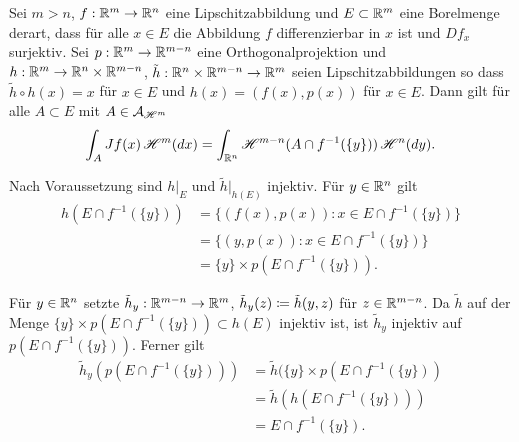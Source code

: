 \documentclass[a4paper,twoside,DIV15,BCOR12mm]{scrbook}
\newcommand{\A}{\mathcal A}
\newcommand{\HM}{\H}
\begin{document}
\begin{lemma}
\label{lem:3.15}
Sei $m>n$, $f:\mathbb{R}^m\to\mathbb{R}^n$ eine Lipschitzabbildung und $E\subset \mathbb{R}^m$ eine Borelmenge derart, dass für alle $x\in E$ die Abbildung $f$ differenzierbar in $x$ ist und $Df_x$ surjektiv. Sei $p:\mathbb{R}^m\to\mathbb{R}^{m-n}$ eine Orthogonalprojektion und $h:\mathbb{R}^m \to \mathbb{R}^n \times \mathbb{R}^{m-n}$, $\tilde h: \mathbb{R}^n\times\mathbb{R}^{m-n}\to\mathbb{R}^m$ seien Lipschitzabbildungen so dass $\tilde h \circ h(x) = x$ für $x\in E$ und $h(x) = (f(x),p(x))$ für $x\in E$. Dann gilt für alle $A\subset E$ mit $A\in \A_{\HM^m}$
\[
\int_A Jf(x) \,\HM^m(dx) = \int_{\MdR^n} \HM^{m-n}(A \cap f^{-1}(\{y\}))\, \HM^n(dy).
\]
\end{lemma}

\begin{beweis}
Nach Voraussetzung sind $h|_E$ und $\tilde h|_{h(E)}$ injektiv. Für $y\in\mathbb{R}^n$ gilt
\begin{align*}
h(E \cap f^{-1}(\{y\}))
&= \{(f(x),p(x)) : x\in E\cap f^{-1}(\{y\})\} \\
&= \{(y,p(x)) : x \in E\cap f^{-1}(\{y\})\} \\
&= \{y\}\times p(E\cap f^{-1}(\{y\})).
\end{align*}

Für $y\in\mathbb{R}^n$ setzte $\tilde h_y: \mathbb{R}^{m-n}\to\mathbb{R}^m$, $\tilde h_y (z) \da \tilde h (y,z)$ für $z\in\mathbb{R}^{m-n}$. Da $\tilde h$ auf der Menge $\{y\}\times p(E \cap f^{-1}(\{y\})) \subset h(E)$ injektiv ist, ist $\tilde h_y$ injektiv auf $p(E\cap f^{-1}(\{y\}))$. Ferner gilt
\begin{align*}
\tilde h_y(p(E\cap f^{-1}(\{y\})))
&=\tilde h(\{y\}\times p(E\cap f^{-1}(\{y\}))\\
&= \tilde h (h (E\cap f^{-1}(\{y\})))\\
&= E\cap f^{-1}(\{y\}) \tag{$*$}.
\end{align*}


\end{beweis}
\end{document}
